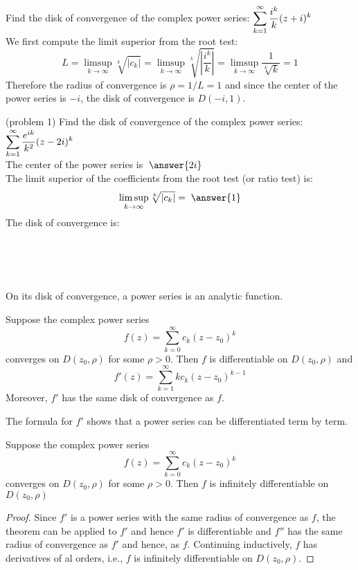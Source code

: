 \documentclass[handout]{ximera}
\begin{document}
\begin{example}[example 1]
Find the disk of convergence of the complex power series: $\displaystyle \sum_{k=1}^\infty \frac{i^k}{k}(z+i)^k$\\
We first compute the limit superior from the root test:
\[
L = \limsup_{k \to \infty} \sqrt[k]{|c_k|} = \limsup_{k \to \infty} \sqrt[k]{|\frac{i^k}{k}|} = \limsup_{k \to \infty} \frac{1}{\sqrt[k]{k}} = 1
\]
Therefore the radius of convergence is $\rho = 1/L = 1$ and since the center of the power series is $-i$, the disk of convergence is $D(-i, 1)$.
\end{example}

\begin{problem}(problem 1)
Find the disk of convergence of the complex power series: $\displaystyle \sum_{k=1}^\infty \frac{e^{ik}}{k^2}(z-2i)^k$\\
The center of the power series is $\; \answer{2i}$\\
The limit superior of the coefficients from the root test (or ratio test) is:
\[
\limsup_{k \to \infty} \sqrt[k]{|c_k|} = \; \answer{1}
\]
The disk of convergence is:
\begin{multipleChoice}
\\
\\
\\
\end{multipleChoice}
\end{problem}

On its disk of convergence, a power series is an analytic function.
\begin{theorem}
Suppose the complex power series
\[
f(z) = \sum_{k=0}^\infty c_k(z-z_0)^k
\]
converges on $D(z_0, \rho)$ for some $\rho > 0$.
Then $f$ is differentiable on $D(z_0, \rho)$ and 
\[
f'(z) = \sum_{k=1}^\infty kc_k(z-z_0)^{k-1}
\]
Moreover, $f'$ has the same disk of convergence as $f$.
\end{theorem}
\begin{remark}
The formula for $f'$ shows that a power series can be differentiated term by term.
\end{remark}
\begin{corollary}
Suppose the complex power series
\[
f(z) = \sum_{k=0}^\infty c_k(z-z_0)^k
\]
converges on $D(z_0, \rho)$ for some $\rho > 0$.
Then $f$ is infinitely differentiable on $D(z_0, \rho)$
\end{corollary}

\begin{proof}
Since $f'$ is a power series with the same radius of convergence as $f$, the theorem can be applied to $f'$ and hence
$f'$ is differentiable and $f''$ has the same radius of convergence as $f'$ and hence, as $f$. Continuing inductively, $f$
has derivatives of al orders, i.e., $f$ is infinitely differentiable on $D(z_0, \rho)$.
\end{proof}
\end{document}
